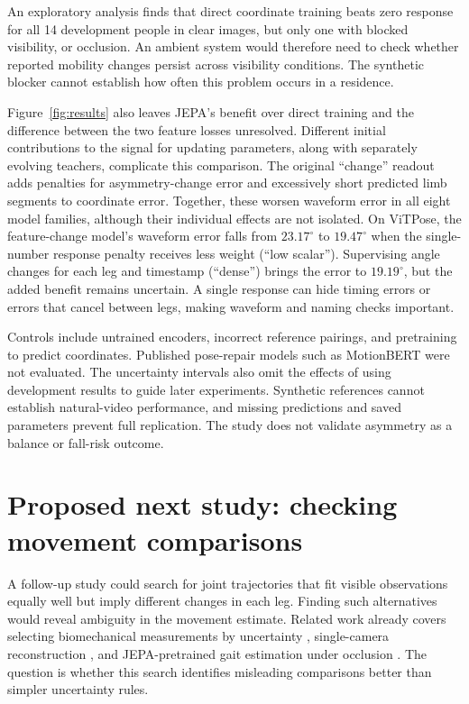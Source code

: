 \documentclass{article}
\newcommand{\dg}{^{\circ}}
\begin{document}
An exploratory analysis finds that direct coordinate training beats zero response for all 14 development people in clear images, but only one with blocked visibility, or occlusion. An ambient system would therefore need to check whether reported mobility changes persist across visibility conditions. The synthetic blocker cannot establish how often this problem occurs in a residence.

Figure~\ref{fig:results} also leaves JEPA's benefit over direct training and the difference between the two feature losses unresolved. Different initial contributions to the signal for updating parameters, along with separately evolving teachers, complicate this comparison. The original ``change'' readout adds penalties for asymmetry-change error and excessively short predicted limb segments to coordinate error. Together, these worsen waveform error in all eight model families, although their individual effects are not isolated. On ViTPose, the feature-change model's waveform error falls from $23.17\dg$ to $19.47\dg$ when the single-number response penalty receives less weight (``low scalar''). Supervising angle changes for each leg and timestamp (``dense'') brings the error to $19.19\dg$, but the added benefit remains uncertain. A single response can hide timing errors or errors that cancel between legs, making waveform and naming checks important.

Controls include untrained encoders, incorrect reference pairings, and pretraining to predict coordinates. Published pose-repair models such as MotionBERT \citep{zhu2023motionbert} were not evaluated. The uncertainty intervals also omit the effects of using development results to guide later experiments. Synthetic references cannot establish natural-video performance, and missing predictions and saved parameters prevent full replication. The study does not validate asymmetry as a balance or fall-risk outcome.

\section{Proposed next study: checking movement comparisons}
A follow-up study could search for joint trajectories that fit visible observations equally well but imply different changes in each leg. Finding such alternatives would reveal ambiguity in the movement estimate. Related work already covers selecting biomechanical measurements by uncertainty \citep{pace2026uncertainty}, single-camera reconstruction \citep{gilon2026opencap}, and JEPA-pretrained gait estimation under occlusion \citep{mehraban2026synthgait}. The question is whether this search identifies misleading comparisons better than simpler uncertainty rules.
\end{document}
